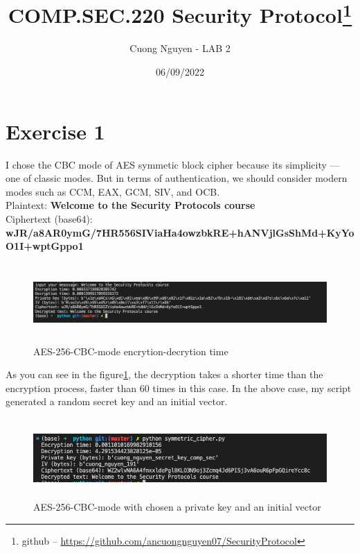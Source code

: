 \documentclass{article}
\title{COMP.SEC.220 Security Protocol\footnote{github -- \url{https://github.com/ancuongnguyen07/SecurityProtocol}}}
\author{Cuong Nguyen - LAB 2}
\date{06/09/2022}
\begin{document}
    
\maketitle

\section*{Exercise 1}
%
I chose the CBC mode of AES symmetic block cipher because its simplicity --- one of
classic modes. But in terms of authentication, we should consider modern modes such as
CCM, EAX, GCM, SIV, and OCB.\\

Plaintext: \textbf{Welcome to the Security Protocols course}\\
Ciphertext (base64):\\
\textbf{wJR/a8AR0ymG/7HR556SIViaHa4owzbkRE+hANVjlGsShMd+KyYoO1I+wptGppo1}

\begin{figure}[hpt]
    \centering
    \includegraphics[width=140mm, height=30mm]{aes.png}
    \caption{AES-256-CBC-mode encrytion-decrytion time}
    \label{fig:aes-cbc}
\end{figure}

As you can see in the figure\ref*{fig:aes-cbc}, the decryption takes a shorter time than
the encryption process, faster than 60 times in this case. In the above case, my script
generated a random secret key and an initial vector.\\

\begin{figure}[hpt]
    \centering
    \includegraphics[width=140mm, height=30mm]{aes_chosen_key.png}
    \caption{AES-256-CBC-mode with chosen a private key and an initial vector}
    \label{fig:aes-cbc-chosen}
\end{figure}
\end{document}
